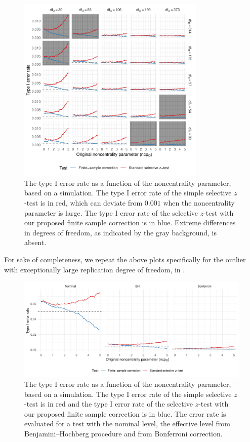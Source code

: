 \documentclass[11pt]{article}
\theoremstyle{definition}
\theoremstyle{custom}
\begin{document}
  \begin{figure}[htbp]
    \centering
    \includegraphics[width=0.8\textwidth]{t-approx-bonf}
    \caption{The type I error rate as a function of the noncentrality parameter, based on a simulation. The type I error rate of the simple selective $z$-test is in red, which can deviate from $0.001$ when the noncentrality parameter is large. The type I error rate of the selective $z$-test with our proposed finite sample correction is in blue. Extreme differences in degrees of freedom, as indicated by the gray background, is absent.}
  \label{fig:t-approx-bonf}
  \end{figure}

  For sake of completeness, we repeat the above plots specifically for the outlier \citep[Study 97;][]{PurdieVaughns:2008en} with exceptionally large replication degree of freedom, in .
  \begin{figure}[htbp]
    \centering
    \includegraphics[width=\textwidth]{t-approx-pv}
    \caption{The type I error rate as a function of the noncentrality parameter, based on a simulation. The type I error rate of the simple selective $z$-test is in red and the type I error rate of the selective $z$-test with our proposed finite sample correction is in blue. The error rate is evaluated for a test with the nominal level, the effective level from Benjamini--Hochberg procedure and from Bonferroni correction.}
  \label{fig:t-approx-pv}
  \end{figure}
\end{document}
